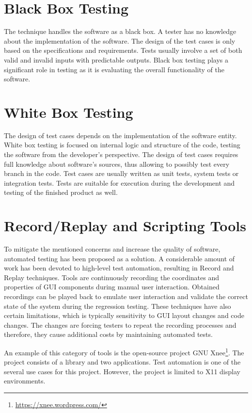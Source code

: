 \section{Black Box Testing}
The technique handles the software as a black box. A tester has no knowledge about the implementation of the software. The design of the test cases is only based on the specifications and requirements. Tests usually involve a set of both valid and invalid inputs with predictable outputs. Black box testing plays a significant role in testing as it is evaluating the overall functionality of the software.\cite{white_black}

\section{White Box Testing}
The design of test cases depends on the implementation of the software entity. White box testing is focused on internal logic and structure of the code, testing the software from the developer's perspective. The design of test cases requires full knowledge about software's sources, thus allowing to possibly test every branch in the code. Test cases are usually written as unit tests, system tests or integration tests. Tests are suitable for execution during the development and testing of the finished product as well.\cite{white_black}

\section{Record/Replay and Scripting Tools}\label{record_replay}
To mitigate the mentioned concerns and increase the quality of software, automated testing has been proposed as a solution. A considerable amount of work has been devoted to high-level test automation, resulting in Record and Replay techniques. Tools are continuously recording the coordinates and properties of GUI components during manual user interaction. Obtained recordings can be played back to emulate user interaction and validate the correct state of the system during the regression testing. These techniques have also certain limitations, which is typically sensitivity to GUI layout changes and code changes. The changes are forcing testers to repeat the recording processes and therefore, they cause additional costs by maintaining automated tests.\cite{guitesting} 

An example of this category of tools is the open-source project GNU Xnee\footnote{\url{https://xnee.wordpress.com/}}. The project consists of a library and two applications. Test automation is one of the several use cases for this project. However, the project is limited to X11 display environments.\cite{xnee}

